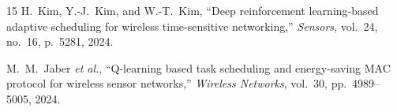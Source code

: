 \documentclass[journal]{IEEEtran}
\begin{document}
\begin{thebibliography}{15}
H.~Kim, Y.-J.~Kim, and W.-T.~Kim,
``Deep reinforcement learning-based adaptive scheduling for wireless
time-sensitive networking,''
\emph{Sensors}, vol.~24, no.~16, p.~5281, 2024.

M.~M.~Jaber \emph{et al.},
``Q-learning based task scheduling and energy-saving MAC protocol for
wireless sensor networks,''
\emph{Wireless Networks}, vol.~30, pp.~4989--5005, 2024.

\end{thebibliography}

\vfill

\end{document}
